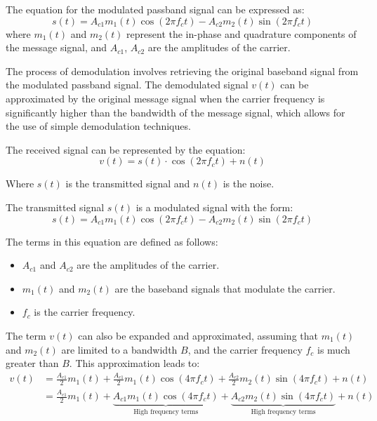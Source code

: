 The equation for the modulated passband signal can be expressed as:
\begin{equation}
s(t) = A_{c1} m_1(t) \cos(2\pi f_c t) - A_{c2} m_2(t) \sin(2\pi f_c t)
\end{equation}
where \( m_1(t) \) and \( m_2(t) \) represent the in-phase and quadrature components of the message signal, and \( A_{c1} \), \( A_{c2} \) are the amplitudes of the carrier.

The process of demodulation involves retrieving the original baseband signal from the modulated passband signal. The demodulated signal \( v(t) \) can be approximated by the original message signal when the carrier frequency is significantly higher than the bandwidth of the message signal, which allows for the use of simple demodulation techniques.




The received signal can be represented by the equation:
\begin{equation}
    v(t) = s(t) \cdot \cos(2\pi f_c t) + n(t)
\end{equation}

Where \( s(t) \) is the transmitted signal and \( n(t) \) is the noise.

The transmitted signal \( s(t) \) is a modulated signal with the form:
\begin{equation}
    s(t) = A_{c1} m_1(t) \cos(2\pi f_c t) - A_{c2} m_2(t) \sin(2\pi f_c t)
\end{equation}

The terms in this equation are defined as follows:
\begin{itemize}
    \item \( A_{c1} \) and \( A_{c2} \) are the amplitudes of the carrier.
    \item \( m_1(t) \) and \( m_2(t) \) are the baseband signals that modulate the carrier.
    \item \( f_c \) is the carrier frequency.
\end{itemize}

The term \( v(t) \) can also be expanded and approximated, assuming that \( m_1(t) \) and \( m_2(t) \) are limited to a bandwidth \( B \), and the carrier frequency \( f_c \) is much greater than \( B \). This approximation leads to:
\begin{align}
    v(t) & = \frac{A_{c1}}{2} m_1(t) + \frac{A_{c1}}{2} m_1(t) \cos(4\pi f_c t) + \frac{A_{c2}}{2} m_2(t) \sin(4\pi f_c t) + n(t) \\
    & = \frac{A_{c1}}{2} m_1(t) + \underbrace{A_{c1} m_1(t) \cos(4\pi f_c t)}_{\text{High frequency terms}} + \underbrace{A_{c2} m_2(t) \sin(4\pi f_c t)}_{\text{High frequency terms}} + n(t)
\end{align}


